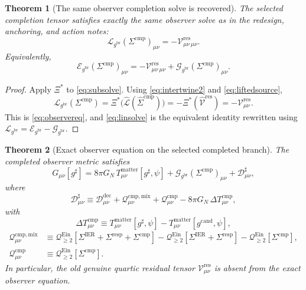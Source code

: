 \documentclass[11pt]{article}
\newcommand{\ObserverMap}{\Xi}
\newcommand{\ObserverMetric}{g^{\mathrm{br}}}
\newcommand{\CandidateMetric}{g^{\mathrm{cand}}}
\newcommand{\CompletedMetric}{g^{\sharp}}
\newcommand{\BaseShift}{\Sigma^{\mathrm{IER}}}
\newcommand{\ResponseShift}{\Sigma^{\mathrm{resp}}}
\newcommand{\CompShift}{\Sigma^{\mathrm{cmp}}}
\newcommand{\CompLift}{\widehat\Sigma^{\mathrm{cmp}}}
\newcommand{\ResidualCore}{\mathcal V_{\mu\nu}^{\mathrm{res}}}
\newcommand{\ResidualDec}{\mathcal D_{\mu\nu}^{\mathrm{dec}}}
\newcommand{\ResidualLift}{\widehat{\mathcal V}^{\mathrm{res}}}
\newcommand{\SubReducedEin}{\widehat{\mathcal L}}
\newcommand{\ReducedEin}{\mathcal L_{\ObserverMetric}}
\newcommand{\GaugeBook}{\mathcal G_{\ObserverMetric}}
\newcommand{\EinLin}{\mathcal E_{\ObserverMetric}}
\newcommand{\EinQuad}{\mathcal Q_{\ge 2}^{\mathrm{Ein}}}
\newcommand{\CompMix}{\mathcal Q_{\mu\nu}^{\mathrm{cmp,mix}}}
\newcommand{\CompQuad}{\mathcal Q_{\mu\nu}^{\mathrm{cmp}}}
\newcommand{\CompDec}{\mathcal D_{\mu\nu}^{\sharp}}
\newcommand{\DeltaTComp}{\Delta T_{\mu\nu}^{\mathrm{cmp}}}
\newtheorem{theorem}{Theorem}
\begin{document}
\begin{theorem}[The same observer completion solve is recovered]
\label{thm:pullback}
The selected completion tensor satisfies exactly the same observer solve as in the redesign, anchoring, and action notes:
\begin{equation}
\ReducedEin(\CompShift)_{\mu\nu}
=
-\ResidualCore{}_{\mu\nu}.
\label{eq:observereq}
\end{equation}
Equivalently,
\begin{equation}
\EinLin(\CompShift)_{\mu\nu}
=
-\ResidualCore{}_{\mu\nu}
+\GaugeBook(\CompShift)_{\mu\nu}.
\label{eq:linsolve}
\end{equation}
\end{theorem}

\begin{proof}
Apply \(\ObserverMap^*\) to \eqref{eq:subsolve}. Using \eqref{eq:intertwine2} and \eqref{eq:liftedsource},
\[
\ReducedEin(\CompShift)
=
\ObserverMap^*\bigl(\SubReducedEin(\CompLift)\bigr)
=
-\ObserverMap^*(\ResidualLift)
=
-\ResidualCore.
\]
This is \eqref{eq:observereq}, and \eqref{eq:linsolve} is the equivalent identity rewritten using \(\ReducedEin=\EinLin-\GaugeBook\).
\end{proof}

\begin{theorem}[Exact observer equation on the selected completed branch]
\label{thm:obs}
The completed observer metric satisfies
\begin{equation}
G_{\mu\nu}[\CompletedMetric]
=
8\pi G_N\,T_{\mu\nu}^{\mathrm{matter}}[\CompletedMetric,\psi]
+\GaugeBook(\CompShift)_{\mu\nu}
+\CompDec,
\label{eq:newobs}
\end{equation}
where
\begin{equation}
\CompDec
\equiv
\ResidualDec+\CompMix+\CompQuad-8\pi G_N\,\DeltaTComp,
\label{eq:compdec}
\end{equation}
with
\begin{equation}
\DeltaTComp
\equiv
T_{\mu\nu}^{\mathrm{matter}}[\CompletedMetric,\psi]
-T_{\mu\nu}^{\mathrm{matter}}[\CandidateMetric,\psi],
\label{eq:deltat}
\end{equation}
\begin{align}
\CompMix
&\equiv
\EinQuad[\BaseShift+\ResponseShift+\CompShift]
-\EinQuad[\BaseShift+\ResponseShift]
-\EinQuad[\CompShift],
\label{eq:compmix}
\\
\CompQuad
&\equiv
\EinQuad[\CompShift].
\label{eq:compquad}
\end{align}
In particular, the old genuine quartic residual tensor \(\ResidualCore\) is absent from the exact observer equation.
\end{theorem}
\end{document}
